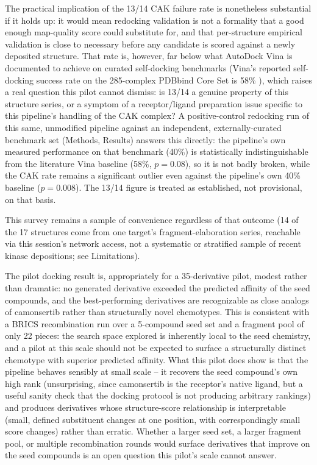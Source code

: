 \documentclass[11pt]{article}
\begin{document}
The practical implication of the 13/14 CAK failure rate is nonetheless
substantial if it holds up: it would mean redocking validation is not a
formality that a good enough map-quality score could substitute for, and
that per-structure empirical validation is close to necessary before any
candidate is scored against a newly deposited structure. That rate is,
however, far below what AutoDock Vina is documented to achieve on
curated self-docking benchmarks (Vina's reported self-docking success
rate on the 285-complex PDBbind Core Set is 58\% \citep{zhang2023}), which
raises a real question this pilot cannot dismiss: is 13/14 a genuine
property of this structure series, or a symptom of a receptor/ligand
preparation issue specific to this pipeline's handling of the CAK
complex? A positive-control redocking run of this same, unmodified
pipeline against an independent, externally-curated benchmark set
(Methods, Results) answers this directly: the pipeline's own measured
performance on that benchmark (40\%) is statistically indistinguishable
from the literature Vina baseline (58\%, $p=0.08$), so it is not badly
broken, while the CAK rate remains a significant outlier even against the
pipeline's own 40\% baseline ($p=0.008$). The 13/14 figure is treated as
established, not provisional, on that basis.

This survey remains a sample of convenience regardless of that outcome
(14 of the 17 structures come from one target's fragment-elaboration
series, reachable via this session's network access, not a systematic or
stratified sample of recent kinase depositions; see Limitations).

The pilot docking result is, appropriately for a 35-derivative pilot,
modest rather than dramatic: no generated derivative exceeded the predicted
affinity of the seed compounds, and the best-performing derivatives are
recognizable as close analogs of camonsertib rather than structurally novel
chemotypes. This is consistent with a BRICS recombination run over a
5-compound seed set and a fragment pool of only 22 pieces: the search space
explored is inherently local to the seed chemistry, and a pilot at this
scale should not be expected to surface a structurally distinct chemotype
with superior predicted affinity. What this pilot does show is that the
pipeline behaves sensibly at small scale -- it recovers the seed compound's
own high rank (unsurprising, since camonsertib is the receptor's native
ligand, but a useful sanity check that the docking protocol is not
producing arbitrary rankings) and produces derivatives whose structure-score
relationship is interpretable (small, defined substituent changes at one
position, with correspondingly small score changes) rather than
erratic. Whether a larger seed set, a larger fragment pool, or multiple
recombination rounds would surface derivatives that improve on the seed
compounds is an open question this pilot's scale cannot answer.
\end{document}
